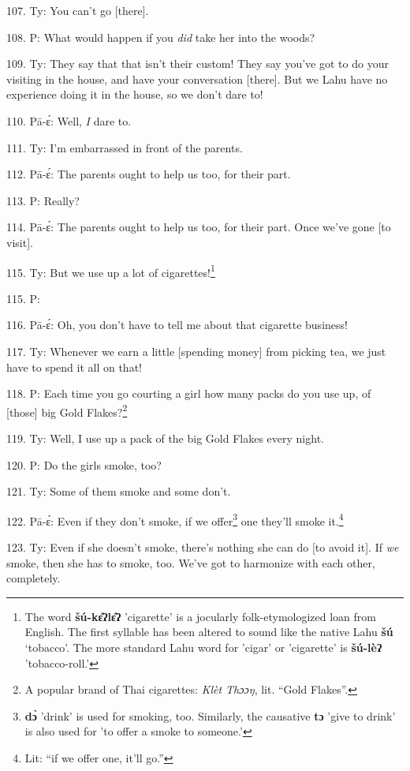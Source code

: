 107. Ty: You can't go [there].

108. P: What would happen if you \textit{did} take her into the woods?

109. Ty: They say that that isn't their custom! They say you've got to do
your visiting in the house, and have your conversation [there]. But we Lahu have
no experience doing it in the house, so we don't dare to!

110. Pā-ɛ́: Well,\textit{ I} dare to.

111. Ty: I'm embarrassed in front of the parents.

112. Pā-ɛ́: The parents ought to help us too, for their part.

113. P: Really?

114. Pā-ɛ́: The parents ought to help us too, for their part. Once we've gone
[to visit].

115. Ty: But we use up a lot of cigarettes!\footnote{The word \textbf{šú-kɛ̂ʔlɛ̂ʔ} 'cigarette' is a jocularly folk-etymologized loan from English. The first syllable has been altered to sound like the native Lahu \textbf{šú} `tobacco'. The more standard Lahu word for 'cigar' or 'cigarette' is \textbf{šú-lèʔ} 'tobacco-roll.'}

115. P: 

116. Pā-ɛ́: Oh, you don't have to tell me about that cigarette business!

117. Ty: Whenever we earn a little [spending money] from picking tea, we just
have to spend it all on that!

118. P:  Each time you go courting a girl how
many packs do you use up, of [those] big Gold Flakes?\footnote{A popular brand of Thai cigarettes: \textit{Klèt Thɔɔŋ}, lit. ``Gold Flakes''.}

119. Ty: Well, I use up a pack of the big Gold Flakes every night.

120. P: Do the girls smoke, too?

121. Ty: Some of them smoke and some don't.

122. Pā-ɛ́: Even if they don't smoke, if we offer\footnote{\textbf{dɔ̀} 'drink' is used for smoking, too. Similarly, the causative \textbf{tɔ} 'give to drink' is also used for 'to offer a smoke to someone.'} one they'll smoke it.\footnote{Lit: ``if we offer one, it'll go.''}

123. Ty: Even if she doesn't smoke, there's nothing she can do [to avoid it].
If \textit{we} smoke, then she has to smoke, too. We've got to harmonize with each
other, completely.

